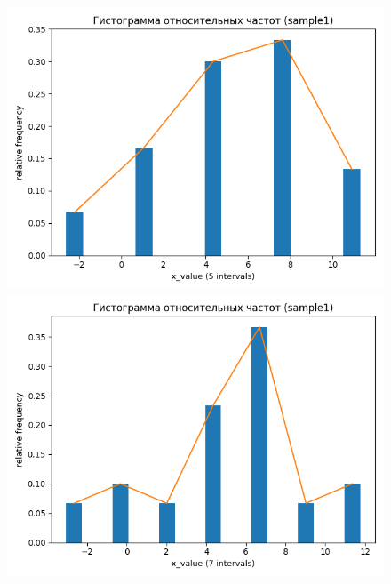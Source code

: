 \begin{figure}[H]
	\begin{minipage}[H]{0.45\linewidth}
		\begin{center}
			\includegraphics[width=\linewidth]{figures/rel_freq_hist_5_bins_sample1}
		\end{center}
	\end{minipage}
	\hfill
	\begin{minipage}[H]{0.45\linewidth}
		\begin{center}
			\includegraphics[width=\linewidth]{figures/rel_freq_hist_7_bins_sample1}
		\end{center}
	\end{minipage}
	\vfill
	\begin{minipage}[H]{0.45\linewidth}

\end{minipage}
\end{figure}
